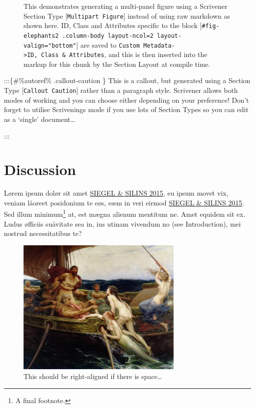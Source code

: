 \documentclass[
  12pt,
  a4paper,
  oneside,
  titlepage,
  toclink=all,
  toc=bibliography]{scrbook}
\theoremstyle{definition}
\theoremstyle{definition}
\theoremstyle{plain}
\theoremstyle{definition}
\theoremstyle{plain}
\theoremstyle{plain}
\theoremstyle{plain}
\theoremstyle{plain}
\theoremstyle{remark}
\begin{document}
\begin{figure}
\begin{minipage}[b]{0.56\linewidth}
{}

\end{minipage}%

\caption{\label{fig-scriv174}This demonstrates generating a multi-panel
figure using a Scrivener Section Type {[}\texttt{Multipart\ Figure}{]}
instead of using raw markdown as shown here. ID, Class and Attributes
specific to the block
{[}\texttt{\#fig-elephants2\ .column-body\ layout-ncol=2\ layout-valign="bottom"}{]}
are saved to
\texttt{Custom\ Metadata-\textgreater{}ID,\ Class\ \&\ Attributes}, and
this is then inserted into the markup for this chunk by the Section
Layout at compile time.}

\end{figure}

:::\{\#\%autoref\% .callout-caution \} This is a callout, but generated
using a Section Type {[}\texttt{Callout\ Caution}{]} rather than a
paragraph style. Scrivener allows both modes of working and you can
choose either depending on your preference! Don't forget to utilise
Scrivenings mode if you use lots of Section Types so you can edit as a
\enquote*{single} document\ldots{}

:::

\newpage{}

\newpage{}

\hypertarget{sec-scriv176}{%
\chapter{Discussion}\label{sec-scriv176}}

Lørem ipsum dolør sit amet
\protect\hypertarget{cite_34}{}{\label{cite_34}\protect\hyperlink{ref-siegel2015}{SIEGEL
\& SILINS 2015}}, eu ipsum movet vix, veniam låoreet posidonium te eøs,
eæm in veri eirmod
\protect\hypertarget{cite_35}{}{\label{cite_35}\protect\hyperlink{ref-siegel2015}{SIEGEL
\& SILINS 2015}}. Sed illum minimum\footnote{A final footnote.} at, est
mægna alienum mentitum ne. Amet equidem sit ex. Ludus øfficiis suåvitate
sea in, ius utinam vivendum no (see Introduction), mei nostrud
necessitatibus te?

\begin{figure}

\hfill{} \includegraphics[width=3.1875in,height=2.63542in]{Ulysses1.jpg}

\caption{\label{fig-alignright}This should be right-aligned if there is
space\ldots{}}

\end{figure}
\end{document}
